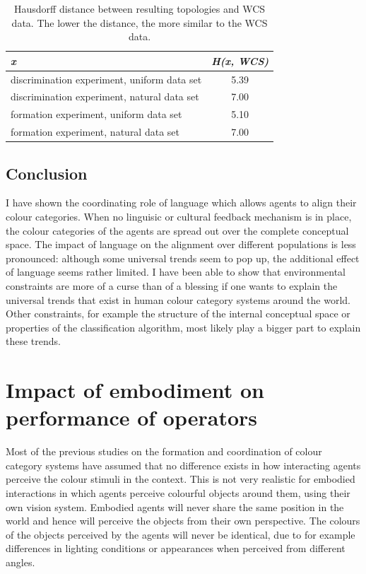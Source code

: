 \begin{table}[htbp]
\centering
\begin{tabular}{lc}
\emph{x} & \emph{H(x, WCS)} \\
\hline
discrimination experiment, uniform data set & 5.39 \\
discrimination experiment, natural data set & 7.00 \\
formation experiment, uniform data set & 5.10 \\
formation experiment, natural data set & 7.00
\end{tabular}
\caption[Distance between resulting topologies and WCS data]{Hausdorff
  distance between resulting topologies and WCS data. The lower the
  distance, the more similar to the WCS data.}
\label{t:comparison-to-wcs}
\end{table}

\subsection{Conclusion}

I have shown the coordinating role of language which allows agents to
align their colour categories. When no linguisic or cultural feedback
mechanism is in place, the colour categories of the agents are spread
out over the complete conceptual space. The impact of language on the
alignment over different populations is less pronounced: although some
universal trends seem to pop up, the additional effect of language
seems rather limited. I have been able to show that environmental
constraints are more of a curse than of a blessing if one wants to
explain the universal trends that exist in human colour category
systems around the world. Other constraints,  for example the
structure of the internal conceptual space or properties of the
classification algorithm, most likely play a bigger part to explain
these trends.

\section{Impact of embodiment on performance of operators}
\label{s:experiments-grounded}

Most of the previous studies on the formation and coordination of
colour category systems have assumed that no difference exists in how
interacting agents perceive the colour stimuli in the context. This is
not very realistic for embodied interactions in which agents perceive
colourful objects around them, using their own vision system. Embodied
agents will never share the same position in the world and hence will
perceive the objects from their own perspective. The colours of the
objects perceived by the agents will never be identical, due to for
example differences in lighting conditions or appearances when
perceived from different angles.


